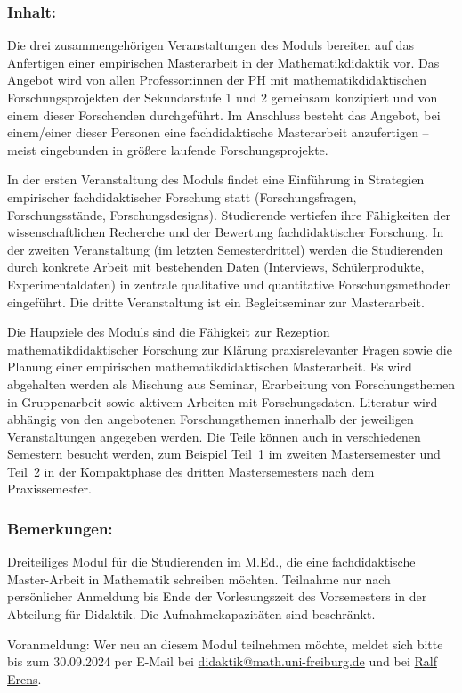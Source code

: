 \documentclass[a4paper,10pt]{article}
\begin{document}
\subsubsection*{\large
    Inhalt:
}
Die drei zusammengehörigen Veranstaltungen des Moduls bereiten auf das Anfertigen einer empirischen Masterarbeit in der Mathematikdidaktik vor. Das Angebot wird von allen Professor:innen der PH mit mathematikdidaktischen Forschungsprojekten der Sekundarstufe 1 und 2 gemeinsam konzipiert und von einem dieser Forschenden durchgeführt. Im Anschluss besteht das Angebot, bei einem/einer dieser Personen eine fachdidaktische Masterarbeit anzufertigen – meist eingebunden in größere laufende Forschungsprojekte.

In der ersten Veranstaltung des Moduls findet eine Einführung in Strategien empirischer fachdidaktischer Forschung statt (Forschungsfragen, Forschungsstände, Forschungsdesigns). Studierende vertiefen ihre Fähigkeiten der wissenschaftlichen Recherche und der Bewertung fachdidaktischer Forschung. In der zweiten Veranstaltung (im letzten Semesterdrittel) werden die Studierenden durch konkrete Arbeit mit bestehenden Daten (Interviews, Schülerprodukte, Experimentaldaten) in zentrale qualitative und quantitative Forschungsmethoden eingeführt. Die dritte Veranstaltung ist ein Begleitseminar zur Masterarbeit.

Die Haupziele des Moduls sind die Fähigkeit zur Rezeption mathematikdidaktischer Forschung zur Klärung praxisrelevanter Fragen sowie die Planung einer empirischen mathematikdidaktischen Masterarbeit.
Es wird abgehalten werden als Mischung aus Seminar, Erarbeitung von Forschungsthemen in Gruppenarbeit sowie aktivem Arbeiten mit Forschungsdaten. Literatur wird abhängig von den angebotenen Forschungsthemen innerhalb der jeweiligen Veranstaltungen angegeben werden. Die Teile können auch in verschiedenen Semestern besucht werden, zum Beispiel Teil~1 im zweiten Mastersemester und Teil~2 in der Kompaktphase des dritten Mastersemesters nach dem Praxissemester.


\subsubsection*{\large
    Bemerkungen:
}
Dreiteiliges Modul für die Studierenden im M.Ed., die eine fachdidaktische Master-Arbeit in Mathematik schreiben möchten. Teilnahme nur nach persönlicher Anmeldung bis Ende der Vorlesungszeit des Vorsemesters in der Abteilung für Didaktik. Die Aufnahmekapazitäten sind beschränkt. \par
Voranmeldung: Wer neu an diesem Modul teilnehmen möchte, meldet sich bitte bis zum 30.09.2024 per E-Mail bei
\href{mailto:didaktik@math.uni-freiburg.de}{didaktik@math.uni-freiburg.de} und bei \href{mailto:erens@ph-freiburg.de}{Ralf Erens}.
\cleardoublepage
\end{document}
